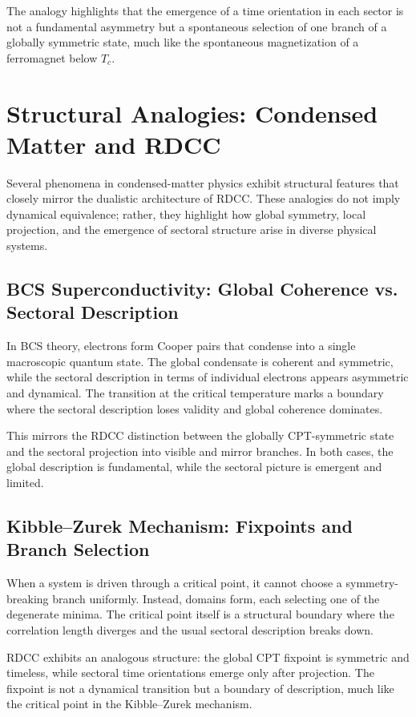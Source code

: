 \documentclass[11pt,a4paper]{article}
\begin{document}
The analogy highlights that the emergence of a time orientation in each sector is not a fundamental asymmetry but a spontaneous selection of one branch of a globally symmetric state, much like the spontaneous magnetization of a ferromagnet below $T_{c}$.

\section{Structural Analogies: Condensed Matter and RDCC}

Several phenomena in condensed-matter physics exhibit structural features that closely mirror the dualistic architecture of RDCC. These analogies do not imply dynamical equivalence; rather, they highlight how global symmetry, local projection, and the emergence of sectoral structure arise in diverse physical systems.

\subsection{BCS Superconductivity: Global Coherence vs. Sectoral Description}

In BCS theory, electrons form Cooper pairs that condense into a single macroscopic quantum state. The global condensate is coherent and symmetric, while the sectoral description in terms of individual electrons appears asymmetric and dynamical. The transition at the critical temperature marks a boundary where the sectoral description loses validity and global coherence dominates.

This mirrors the RDCC distinction between the globally CPT-symmetric state and the sectoral projection into visible and mirror branches. In both cases, the global description is fundamental, while the sectoral picture is emergent and limited.

\subsection{Kibble--Zurek Mechanism: Fixpoints and Branch Selection}

When a system is driven through a critical point, it cannot choose a symmetry-breaking branch uniformly. Instead, domains form, each selecting one of the degenerate minima. The critical point itself is a structural boundary where the correlation length diverges and the usual sectoral description breaks down.

RDCC exhibits an analogous structure: the global CPT fixpoint is symmetric and timeless, while sectoral time orientations emerge only after projection. The fixpoint is not a dynamical transition but a boundary of description, much like the critical point in the Kibble--Zurek mechanism.
\end{document}
